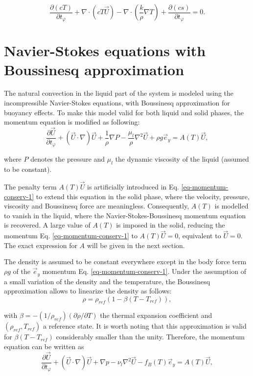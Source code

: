 \begin{equation}\label{eq-energie-enth-model}
\frac{\partial \left(c T\right)}{\partial t_{\varphi}} + \nabla \cdot\left( c T \vec{U}\right) -
\nabla \cdot\left( \frac{k}{\rho} \nabla T \right) +  \frac{\partial \left(c s\right)}{\partial t_{\varphi}}  = 0.
\end{equation}

\section{Navier-Stokes equations with Boussinesq approximation}

The natural convection in the liquid part of the system is modeled using the incompressible Navier-Stokes equations, with  Boussinesq approximation for buoyancy effects. To make this model valid for both liquid and solid phases, the momentum equation is modified as following:
\begin{equation}\label{eq-momentum-conserv-1}
\frac{\partial \vec{U}}{\partial t_{\varphi}} +   {(\vec{U}\cdot\nabla ) \vec{U}} + \frac{1}{\rho}\nabla P - \frac{\mu_{l}}{\rho}   {\nabla^2 \vec{U}} 
+ \rho g \vec{e}_y= A(T) \vec{U},
\end{equation}

\noindent where $P$ denotes the pressure and $\mu_{l}$ the dynamic viscosity of the liquid (assumed to be constant).  

\noindent The penalty term $A(T) \vec{U}$ is artificially introduced in Eq. \eqref{eq-momentum-conserv-1} to extend this equation in the solid phase, where the velocity, pressure, viscosity and Boussinesq force are meaningless.  Consequently, $A(T)$  is modelled to vanish in the liquid, where the Navier-Stokes-Boussinesq momentum equation is recovered. A large value of $A(T)$ is imposed in the solid, reducing the momentum Eq. \eqref{eq-momentum-conserv-1}  to $A(T) \vec{U}=0$, equivalent to $\vec{U}=0$. 
The exact expression for $A$ will be given in the next section.

\noindent The density is assumed to be constant everywhere except in the body force term $\rho g$ of the $\vec e_y$ momentum Eq. \eqref{eq-momentum-conserv-1}.
Under the assumption of a small variation of the density and the temperature, the Boussinesq approximation allows to linearize the density as follows:
\begin{equation}
   \rho = \rho_{ref} (1 - \beta (T-T_{ref})),
\end{equation}

\noindent with $\beta = - (1/\rho_{ref}) (\partial \rho / \partial T)$ the thermal expansion coefficient and $(\rho_{ref},T_{ref})$ a reference state.
It is worth noting that this approximation is valid for $\beta (T - T_{ref})$ considerably smaller than the unity.
Therefore, the momentum equation can be written as
\begin{equation}\label{eq-momentum-conserv}
  \frac{\partial \vec{U}}{\partial t_{\varphi}} +   {(\vec{U}\cdot\nabla ) \vec{U}} + \nabla p - \nu_{l}  {\nabla^2 \vec{U}} 
- f_B(T) \vec{e}_y= A(T) \vec{U},
\end{equation}

